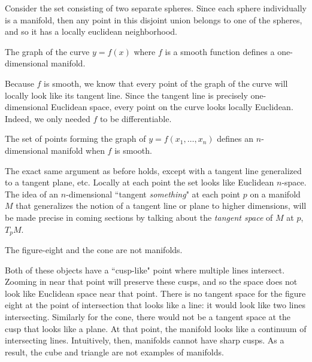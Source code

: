 \documentclass[../master.tex]{subfiles}
\begin{document}
	Consider the set consisting of two separate spheres. Since each sphere individually is a manifold, then any point in this disjoint union belongs to one of the spheres, and so it has a locally euclidean neighborhood.
	
	\begin{example}
		The graph of the curve $y=f(x)$ where $f$ is a smooth function defines a one-dimensional manifold.
	\end{example}
	
	Because $f$ is smooth, we know that every point of the graph of the curve will locally look like its tangent line. Since the tangent line is precisely one-dimensional Euclidean space, every point on the curve looks locally Euclidean. Indeed, we only needed $f$ to be differentiable.
	
	\begin{example}
		The set of points forming the graph of $y = f(x_1, \dots, x_n)$ defines an $n$-dimensional manifold when $f$ is smooth.
	\end{example}
	
	The exact same argument as before holds, except with a tangent line generalized to a tangent plane, etc. Locally at each point the set looks like Euclidean $n$-space. The idea of an $n$-dimensional ``tangent \emph{something}" at each point $p$ on a manifold $M$ that generalizes the notion of a tangent line or plane to higher dimensions, will be made precise in coming sections by talking about the \emph{tangent space} of $M$ at $p$, $T_p M$.

	
	\begin{example}
		The figure-eight and the cone are not manifolds.
	\end{example}
	
	
	Both of these objects have a ``cusp-like" point where multiple lines intersect. Zooming in near that point will preserve these cusps, and so the space does not look like Euclidean space near that point. There is no tangent space for the figure eight at the point of intersection that looks like a line: it would look like two lines intersecting. Similarly for the cone, there would not be a tangent space at the cusp that looks like a plane. At that point, the manifold looks like a continuum of intersecting lines. Intuitively, then, manifolds cannot have sharp cusps. As a result, the cube and triangle are not examples of manifolds. \\
	
\end{document}
